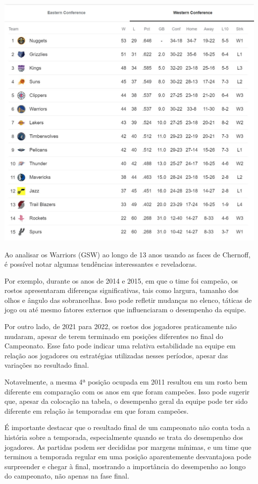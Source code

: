 \documentclass[
]{book}
\begin{document}
\includegraphics[width=5.79167in,height=\textheight]{imagens/22.jpeg}

Ao analisar os Warriors (GSW) ao longo de 13 anos usando as faces de Chernoff, é possível notar algumas tendências interessantes e reveladoras.

Por exemplo, durante os anos de 2014 e 2015, em que o time foi campeão, os rostos apresentaram diferenças significativas, tais como largura, tamanho dos olhos e ângulo das sobrancelhas. Isso pode refletir mudanças no elenco, táticas de jogo ou até mesmo fatores externos que influenciaram o desempenho da equipe.

Por outro lado, de 2021 para 2022, os rostos dos jogadores praticamente não mudaram, apesar de terem terminado em posições diferentes no final do Campeonato. Esse fato pode indicar uma relativa estabilidade na equipe em relação aos jogadores ou estratégias utilizadas nesses períodos, apesar das variações no resultado final.

Notavelmente, a mesma 4ª posição ocupada em 2011 resultou em um rosto bem diferente em comparação com os anos em que foram campeões. Isso pode sugerir que, apesar da colocação na tabela, o desempenho geral da equipe pode ter sido diferente em relação às temporadas em que foram campeões.

É importante destacar que o resultado final de um campeonato não conta toda a história sobre a temporada, especialmente quando se trata do desempenho dos jogadores. As partidas podem ser decididas por margens mínimas, e um time que terminou a temporada regular em uma posição aparentemente desvantajosa pode surpreender e chegar à final, mostrando a importância do desempenho ao longo do campeonato, não apenas na fase final.
\end{document}
